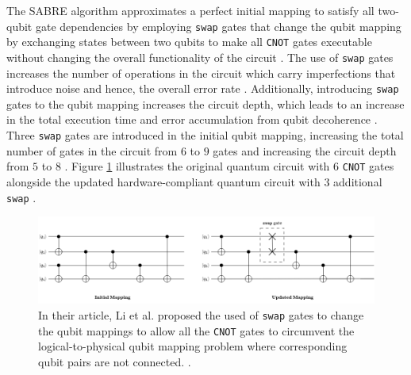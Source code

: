 The SABRE algorithm approximates a perfect initial mapping to satisfy all two-qubit gate dependencies by employing \texttt{swap} gates that change the qubit mapping by exchanging states between two qubits to make all \texttt{CNOT} gates executable without changing the overall functionality of the circuit \cite{li2019tackling}.  The use of \texttt{swap} gates increases the number of operations in the circuit which carry imperfections that introduce noise and hence, the overall error rate \cite{li2019tackling}. Additionally, introducing \texttt{swap} gates to the qubit mapping increases the circuit depth, which leads to an increase in the total execution time and error accumulation from qubit decoherence \cite{li2019tackling}. Three \texttt{swap} gates are introduced in the initial qubit mapping, increasing the total number of gates in the circuit from $6$ to $9$ gates and increasing the circuit depth from $5$ to $8$ \cite{li2019tackling}. Figure \ref{fig:li-qubit-mappings} illustrates the original quantum circuit with 6 \texttt{CNOT} gates alongside the updated hardware-compliant quantum circuit with 3 additional \texttt{swap} \cite{li2019tackling}. 

\begin{figure}[!ht]
	\centering
	\includegraphics[width=1.0\linewidth]{body/ch3/figs/li-qubit-mappings}
	\caption[Hardware-Compliant Quantum Circuit for a 4-qubit Device by Li et al.]{In their article, Li et al. proposed the used of \texttt{swap} gates to change the qubit mappings to allow all the \texttt{CNOT} gates to circumvent the logical-to-physical qubit mapping problem where corresponding qubit pairs are not connected. \cite{li2019tackling}.}
	\label{fig:li-qubit-mappings}
\end{figure}

